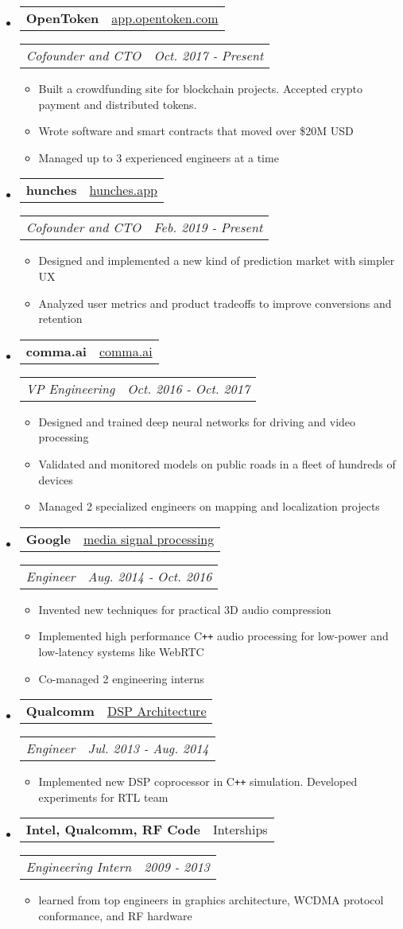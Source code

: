 \documentclass[hidelinks,letterpaper,10pt]{article}
\makeatletter
\newcommand{\resitem}[1]{\item #1 \vspace{-2pt}}
\newcommand{\resheading}[1]{{\large \parashade[.9]{sharpcorners}{\textbf{#1 \vphantom{p\^{E}}}}}
\vspace{-18pt}\noindent\makebox[\linewidth]{\rule{\textwidth}{1pt}}
}
\newcommand{\ressubheading}[4]{
\begin{tabular*}{6.5in}{l@{\extracolsep{\fill}}r}
        \textbf{#1} & #2
\end{tabular*}
\begin{tabular*}{6.5in}{l@{\extracolsep{\fill}}r}
        \textit{#3} & \textit{#4}
\end{tabular*}\vspace{-6pt}
}
\makeatother
\begin{document}
\resheading{Work}
\begin{itemize}
\item
	\ressubheading{OpenToken}{\href{https://app.opentoken.com}{app.opentoken.com}}{Cofounder and CTO}{Oct. 2017 - Present}
	\begin{itemize}
		\resitem{Built a crowdfunding site for blockchain projects. Accepted crypto payment and distributed tokens.}
		\resitem{Wrote software and smart contracts that moved over \$20M USD}
		\resitem{Managed up to 3 experienced engineers at a time}
	\end{itemize}

\item
	\ressubheading{hunches}{\href{https://hunches.app}{hunches.app}}{Cofounder and CTO}{Feb. 2019 - Present}
	\begin{itemize}
		\resitem{Designed and implemented a new kind of prediction market with simpler UX}
		\resitem{Analyzed user metrics and product tradeoffs to improve conversions and retention}
	\end{itemize}

\item
	\ressubheading{comma.ai}{\href{https://comma.ai}{comma.ai}}{VP Engineering}{Oct. 2016 - Oct. 2017}
	\begin{itemize}
    \resitem{Designed and trained deep neural networks for driving and video processing}
		\resitem{Validated and monitored models on public roads in a fleet of hundreds of devices}
		\resitem{Managed 2 specialized engineers on mapping and localization projects}
	\end{itemize}

\item
	\ressubheading{Google}{\href{https://google.com}{media signal processing}}{Engineer}{Aug. 2014 - Oct. 2016}
	\begin{itemize}
		\resitem{Invented new techniques for practical 3D audio compression}
		\resitem{Implemented high performance C\texttt{++} audio processing for low-power and low-latency systems like WebRTC}
		\resitem{Co-managed 2 engineering interns}
	\end{itemize}

\item
	\ressubheading{Qualcomm}{\href{en.wikipedia.org/wiki/Qualcomm_Hexagon}{DSP Architecture}}{Engineer}{Jul. 2013 - Aug. 2014}
	\begin{itemize}
		\resitem{Implemented new DSP coprocessor in C\texttt{++} simulation. Developed experiments for RTL team}
	\end{itemize}

\item
	\ressubheading{Intel, Qualcomm, RF Code}{Interships}{Engineering Intern}{2009 - 2013}
	\begin{itemize}
		\resitem{learned from top engineers in graphics architecture, WCDMA protocol conformance, and RF hardware}
	\end{itemize}

\end{itemize}
\end{document}
